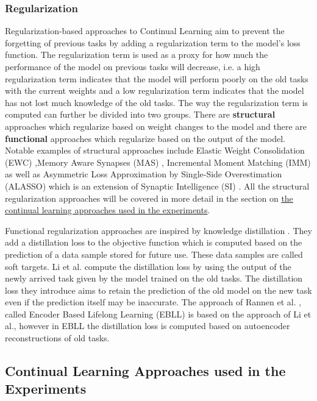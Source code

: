 \subsubsection{Regularization}
Regularization-based approaches to Continual Learning aim to prevent the forgetting of previous tasks by adding a regularization
term to the model's loss function. The regularization term is used as a proxy for how much the performance of the model on previous
tasks will decrease, i.e. a high regularization term indicates that the model will perform poorly on the old tasks with the current
weights and a low regularization term indicates that the model has not lost much knowledge of the old tasks. The way the
regularization term is computed can further be divided into two groups. There are \textbf{structural} approaches which regularize
based on weight changes to the model and there are \textbf{functional} approaches which regularize based on the output of the model.
Notable examples of structural approaches include Elastic Weight Consolidation (EWC) \cite{kirkpatrick2017overcoming},Memory Aware
Synapses (MAS) \cite{aljundi2018memory}, Incremental Moment Matching (IMM) \cite{lee2017overcoming} as well as Asymmetric Loss
Approximation by Single-Side Overestimation (ALASSO) \cite{park2019continual} which is an extension of Synaptic Intelligence (SI)
\cite{zenke2017continual}. All the structural regularization approaches will be covered in more detail in the section on
\hyperref[sec:Related_work:Continual_Learning:Experiments]{the continual learning approaches used in the experiments}. \par
Functional regularization approaches are inspired by knowledge distillation \cite{hinton2015distilling}. They add a distillation
loss to the objective function which is computed based on the prediction of a data sample stored for future use. These data samples
are called soft targets. Li et al. \cite{li2017learning} compute the distillation loss by using the output of the newly arrived task
given by the model trained on the old tasks. The distillation loss they introduce aims to retain the prediction of the old model on
the new task even if the prediction itself may be inaccurate. The approach of Rannen et al.
\cite{rannen2017encoder}, called Encoder Based Lifelong Learning (EBLL) is based on the approach of Li et al., however in EBLL the
distillation loss is computed based on autoencoder reconstructions of old tasks.
\subsection{Continual Learning Approaches used in the Experiments}
\label{sec:Related_work:Continual_Learning:Experiments}
